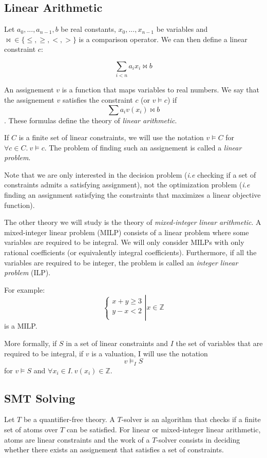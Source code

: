 \documentclass{article}
\newcommand{\ints}{\mathbb{Z}}
\begin{document}
\subsection{Linear Arithmetic}

Let $a_0, ..., a_{n-1}, b$ be real constants, $x_0, ..., x_{n-1}$ be
variables and ${\bowtie} \in \{\leqslant,\geqslant,<,>\}$ is a comparison
operator. We can then define a linear constraint $c$:

$$\sum_{i < n} a_i x_i \bowtie b$$

An assignement $v$ is a function that maps variables to real numbers.
We say that the assignement $v$ satisfies the constraint $c$ (or $v \vDash c$)
if $$\sum a_i v(x_i) \bowtie b$$. These formulas define the theory of
\textit{linear arithmetic}.

If $C$ is a finite set of linear constraints,
we will use the notation $v \vDash C$ for $\forall c \in C.~v \vDash c$. The
problem of finding such an assignement is called a \textit{linear problem}.

Note that we are only interested in the decision problem (\textit{i.e} checking
if a set of constraints admits a satisfying assignment), not the optimization
problem (\textit{i.e} finding an assignment satisfying the constraints that
maximizes a linear objective function). 

The other theory we will study is the theory of \textit{mixed-integer linear
arithmetic}. A mixed-integer linear problem (MILP) consists of a linear
problem where some variables are required to be integral. We will only consider
MILPs with only rational coefficients (or equivalently integral coefficients).
Furthermore, if all the variables are required to be
integer, the problem is called an \textit{integer linear problem} (ILP).

For example:
\begin{displaymath}
  \left\{
  \begin{array}{l}
    x + y \geqslant 3 \\
    y - x < 2 \\
  \end{array}
  \right|
  x \in \ints
\end{displaymath}
is a MILP.

More formally, if $S$ in a set of linear constraints and $I$ the set of
variables that are required to be integral, if $v$ is a valuation, I will use
the notation $$v \vDash_I S$$ for $v \vDash S$ and
$\forall x_i \in I.~v(x_i) \in \ints$.

\subsection{SMT Solving}
\label{smt}
Let $T$ be a quantifier-free theory. A $T$-solver is an algorithm that checks
if a finite set of atoms over $T$ can be satisfied. For linear or mixed-integer
linear arithmetic, atoms are linear constraints and the work of a $T$-solver
consists in deciding whether there exists an assignement
that satisfies a set of constraints.
\end{document}
